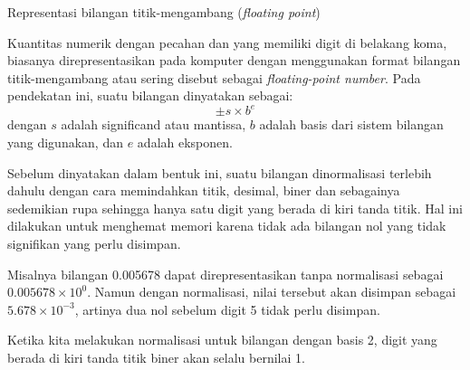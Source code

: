 \begin{frame}{Representasi bilangan titik-mengambang (\textit{floating point})}

Kuantitas numerik dengan pecahan dan yang memiliki digit di belakang koma, biasanya direpresentasikan
pada komputer dengan menggunakan format bilangan titik-mengambang atau sering disebut sebagai
\textit{floating-point number}. Pada pendekatan ini, suatu bilangan dinyatakan sebagai:
\begin{equation*}
\pm s \times b^{e}
\end{equation*}
dengan $s$ adalah significand atau mantissa, $b$ adalah basis dari sistem
bilangan yang digunakan, dan $e$ adalah eksponen.
  
Sebelum dinyatakan dalam bentuk ini, suatu bilangan dinormalisasi terlebih dahulu dengan cara
memindahkan titik, desimal, biner dan sebagainya sedemikian rupa sehingga hanya satu digit
yang berada di kiri tanda titik. Hal ini dilakukan untuk menghemat memori karena tidak ada
bilangan nol yang tidak signifikan yang perlu disimpan.

Misalnya bilangan 0.005678 dapat direpresentasikan tanpa normalisasi sebagai
$0.005678 \times 10^{0}$. Namun dengan normalisasi, nilai tersebut akan disimpan
sebagai $5.678 \times 10^{-3}$, artinya dua nol sebelum digit 5 tidak perlu disimpan.

Ketika kita melakukan normalisasi untuk bilangan dengan basis 2, digit yang berada di kiri tanda
titik biner akan selalu bernilai 1.

\end{frame}





